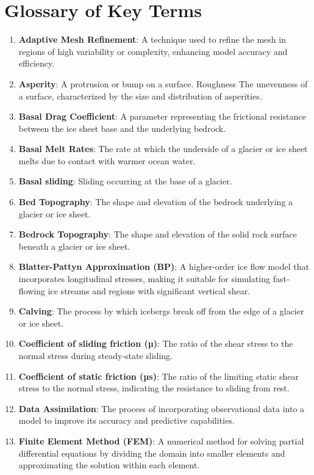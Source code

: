 \chapter{Glossary of Key Terms}\label{glossary}
\begin{enumerate}
\item \textbf{Adaptive Mesh Refinement}: A technique used to refine the mesh in regions of high variability or complexity, enhancing model accuracy and efficiency.
\item \textbf{Asperity}: A protrusion or bump on a surface. Roughness The unevenness of a surface, characterized by the size and distribution of asperities.
\item \textbf{Basal Drag Coefficient}: A parameter representing the frictional resistance between the ice sheet base and the underlying bedrock.
\item \textbf{Basal Melt Rates}: The rate at which the underside of a glacier or ice sheet melts due to contact with warmer ocean water.
\item \textbf{Basal sliding}: Sliding occurring at the base of a glacier.
\item \textbf{Bed Topography}: The shape and elevation of the bedrock underlying a glacier or ice sheet.
\item \textbf{Bedrock Topography}: The shape and elevation of the solid rock surface beneath a glacier or ice sheet.
\item \textbf{Blatter-Pattyn Approximation (BP)}: A higher-order ice flow model that incorporates longitudinal stresses, making it suitable for simulating fast-flowing ice streams and regions with significant vertical shear.
\item \textbf{Calving}: The process by which icebergs break off from the edge of a glacier or ice sheet.
\item \textbf{Coefficient of sliding friction (µ)}: The ratio of the shear stress to the normal stress during steady-state sliding.
\item \textbf{Coefficient of static friction (µs)}: The ratio of the limiting static shear stress to the normal stress, indicating the resistance to sliding from rest.
\item \textbf{Data Assimilation}: The process of incorporating observational data into a model to improve its accuracy and predictive capabilities.
\item \textbf{Finite Element Method (FEM)}: A numerical method for solving partial differential equations by dividing the domain into smaller elements and approximating the solution within each element.

\end{enumerate}
